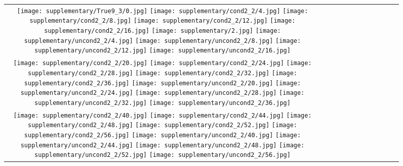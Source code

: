 \begin{figure*}[tb!]
    \centering
    \setlength{\tabcolsep}{0.5pt}
    {\small
    \renewcommand{\arraystretch}{0.5} 
    \begin{tabular}{c c c c c c c c c c c c }
    \captionsetup{type=figure, font=scriptsize}
  \texttt{[image: supplementary/True9\_3/0.jpg]}
  \texttt{[image: supplementary/cond2\_2/4.jpg]}
  \texttt{[image: supplementary/cond2\_2/8.jpg]}
  \texttt{[image: supplementary/cond2\_2/12.jpg]}
  \texttt{[image: supplementary/cond2\_2/16.jpg]}
  \hspace{5mm}
  \texttt{[image: supplementary/2.jpg]}
  \texttt{[image: supplementary/uncond2\_2/4.jpg]}
  \texttt{[image: supplementary/uncond2\_2/8.jpg]}
  \texttt{[image: supplementary/uncond2\_2/12.jpg]}
  \texttt{[image: supplementary/uncond2\_2/16.jpg]}

 \tabularnewline
  \texttt{[image: supplementary/cond2\_2/20.jpg]}
  \texttt{[image: supplementary/cond2\_2/24.jpg]}
  \texttt{[image: supplementary/cond2\_2/28.jpg]}
  \texttt{[image: supplementary/cond2\_2/32.jpg]}
  \texttt{[image: supplementary/cond2\_2/36.jpg]}
  \hspace{5mm}
  \texttt{[image: supplementary/uncond2\_2/20.jpg]}
  \texttt{[image: supplementary/uncond2\_2/24.jpg]}
  \texttt{[image: supplementary/uncond2\_2/28.jpg]}
  \texttt{[image: supplementary/uncond2\_2/32.jpg]}
  \texttt{[image: supplementary/uncond2\_2/36.jpg]}

\tabularnewline
  \texttt{[image: supplementary/cond2\_2/40.jpg]}
  \texttt{[image: supplementary/cond2\_2/44.jpg]}
  \texttt{[image: supplementary/cond2\_2/48.jpg]}
  \texttt{[image: supplementary/cond2\_2/52.jpg]}
  \texttt{[image: supplementary/cond2\_2/56.jpg]}
  \hspace{5mm}
  \texttt{[image: supplementary/uncond2\_2/40.jpg]}
  \texttt{[image: supplementary/uncond2\_2/44.jpg]}
  \texttt{[image: supplementary/uncond2\_2/48.jpg]}
  \texttt{[image: supplementary/uncond2\_2/52.jpg]}
  \texttt{[image: supplementary/uncond2\_2/56.jpg]}


\end{tabular}}
\end{figure*}
